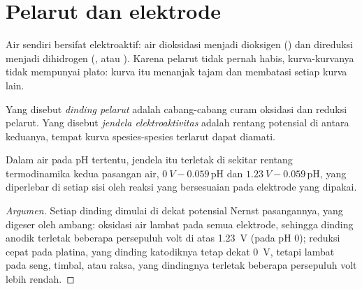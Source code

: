 \section{Pelarut dan elektrode}

Air sendiri bersifat elektroaktif: air dioksidasi menjadi dioksigen
() dan direduksi menjadi dihidrogen
(, atau ). Karena pelarut
tidak pernah habis, kurva-kurvanya tidak mempunyai plato: kurva itu
menanjak tajam dan membatasi setiap kurva lain.

\begin{definition}\label{def:b2:current-potential-curves:window}
Yang disebut \emph{dinding pelarut} adalah
cabang-cabang curam oksidasi dan reduksi pelarut. Yang disebut
\emph{jendela elektroaktivitas} adalah
rentang potensial di antara keduanya, tempat kurva spesies-spesies
terlarut dapat diamati.
\end{definition}

\begin{proposition}\label{prop:b2:current-potential-curves:window}
Dalam air pada pH tertentu, jendela itu terletak di sekitar rentang
termodinamika kedua pasangan air, $\qty{0}{V} - 0.059\,\mathrm{pH}$ dan
$\qty{1.23}{V} -
0.059\,\mathrm{pH}$, yang diperlebar di setiap sisi oleh
 reaksi yang bersesuaian pada elektrode yang dipakai.
\end{proposition}

\begin{proof}[Argumen]
Setiap dinding dimulai di dekat potensial Nernst pasangannya, yang
digeser oleh  ambang: oksidasi air lambat pada semua
elektrode, sehingga dinding anodik terletak beberapa persepuluh volt di
atas \qty{1.23}{V} (pada pH 0); reduksi  cepat pada platina, yang
dinding katodiknya tetap dekat \qty{0}{V}, tetapi lambat pada seng,
timbal, atau raksa, yang dindingnya terletak beberapa persepuluh volt
lebih rendah.
\end{proof}

